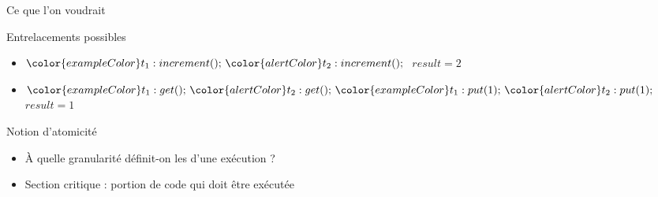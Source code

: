 \begin{frame}[fragile]{Ce que l'on voudrait}
\begin{center}
   \end{center}

  \begin{block}{Entrelacements possibles}
  \vspace{-2mm}
    \begin{itemize}
    \item ${\color{exampleColor}t_1:increment();~} {\color{alertColor}t_2:increment();~}$ \hspace{5mm} $result=2$
    \item ${\color{exampleColor}t_1:get();~} {\color{alertColor}t_2:get();~} {\color{exampleColor}t_1:put(1);~} {\color{alertColor}t_2:put(1);}$ \hspace{5mm} $result=1$
    \end{itemize}
  \end{block}

\pause

  \vspace{-1mm}
  \begin{block}{Notion d'atomicité}
  \vspace{-2mm}
    \begin{itemize}
    \item À quelle granularité définit-on les  d'une exécution ?  
    \item \alert{Section critique} : portion de code qui doit être exécutée 
    \end{itemize}
  \end{block}
\end{frame}



